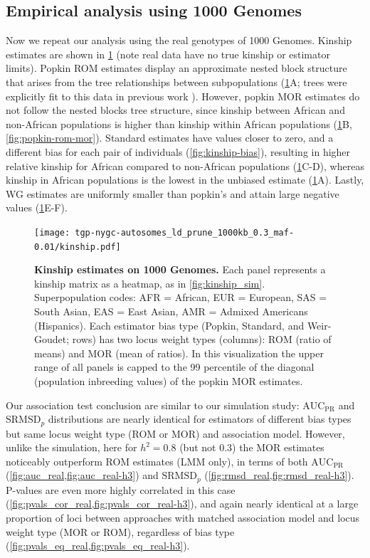 \documentclass[11pt]{article}
\newcommand{\rmsd}{\text{SRMSD}_p}
\newcommand{\auc}{\text{AUC}_\text{PR}}
\begin{document}
\begin{linenumbers}
\subsection{Empirical analysis using 1000 Genomes}

Now we repeat our analysis using the real genotypes of 1000 Genomes.
Kinship estimates are shown in \cref{fig:kinship_real} (note real data have no true kinship or estimator limits).
Popkin ROM estimates display an approximate nested block structure that arises from the tree relationships between subpopulations (\cref{fig:kinship_real}A; trees were explicitly fit to this data in previous work \citep{yao_limitations_2022}).
However, popkin MOR estimates do not follow the nested blocks tree structure, since kinship between African and non-African populations is higher than kinship within African populations (\cref{fig:kinship_real}B, \cref{fig:popkin-rom-mor}).
Standard estimates have values closer to zero, and a different bias for each pair of individuals (\cref{fig:kinship-bias}), resulting in higher relative kinship for African compared to non-African populations (\cref{fig:kinship_real}C-D), whereas kinship in African populations is the lowest in the unbiased estimate (\cref{fig:kinship_real}A).
Lastly, WG estimates are uniformly smaller than popkin's and attain large negative values (\cref{fig:kinship_real}E-F).

\begin{figure}[bp!]
  \centering
  \texttt{[image: tgp-nygc-autosomes\_ld\_prune\_1000kb\_0.3\_maf-0.01/kinship.pdf]}
  \caption{
    {\bf Kinship estimates on 1000 Genomes.}
    Each panel represents a kinship matrix as a heatmap, as in \cref{fig:kinship_sim}.
    Superpopulation codes: AFR = African, EUR = European, SAS = South Asian, EAS = East Asian, AMR = Admixed Americans (Hispanics).
    Each estimator bias type (Popkin, Standard, and Weir-Goudet; rows) has two locus weight types (columns): ROM (ratio of means) and MOR (mean of ratios).
    In this visualization the upper range of all panels is capped to the 99 percentile of the diagonal (population inbreeding values) of the popkin MOR estimates.
  }
  \label{fig:kinship_real}
\end{figure}

Our association test conclusion are similar to our simulation study: $\auc$ and $\rmsd$ distributions are nearly identical for estimators of different bias types but same locus weight type (ROM or MOR) and association model.
However, unlike the simulation, here for $h^2=0.8$ (but not 0.3) the MOR estimates noticeably outperform ROM estimates (LMM only), in terms of both $\auc$ (\cref{fig:auc_real,fig:auc_real-h3}) and $\rmsd$ (\cref{fig:rmsd_real,fig:rmsd_real-h3}).
P-values are even more highly correlated in this case (\cref{fig:pvals_cor_real,fig:pvals_cor_real-h3}), and again nearly identical at a large proportion of loci between approaches with matched association model and locus weight type (MOR or ROM), regardless of bias type (\cref{fig:pvals_eq_real,fig:pvals_eq_real-h3}).


\end{linenumbers}
\end{document}
